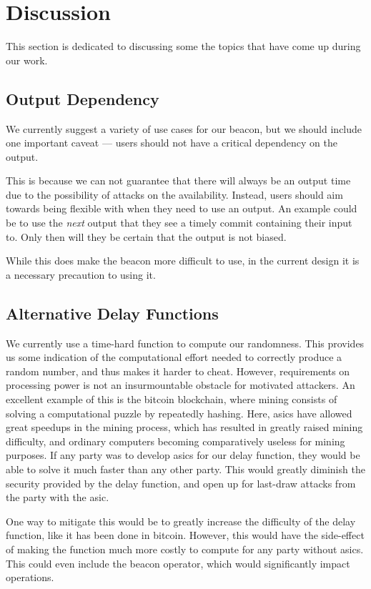 \section{Discussion}%
\label{sec:discussion}
This section is dedicated to discussing some the topics that have come up during our work.

\subsection{Output Dependency}
We currently suggest a variety of use cases for our beacon, but we should include one important caveat --- users should not have a critical dependency on the output.

This is because we can not guarantee that there will always be an output time due to the possibility of attacks on the availability.
Instead, users should aim towards being flexible with when they need to use an output. An example could be to use the \textit{next} output that they see a timely commit containing their input to. Only then will they be certain that the output is not biased.

While this does make the beacon more difficult to use, in the current design it is a necessary precaution to using it.

\subsection{Alternative Delay Functions}
We currently use a time-hard function to compute our randomness. This provides us some indication of the computational effort needed to correctly produce a random number, and thus makes it harder to cheat.
However, requirements on processing power is not an insurmountable obstacle for motivated attackers. An excellent example of this is the bitcoin blockchain, where mining consists of solving a computational puzzle by repeatedly hashing. Here, \glspl{asic} have allowed great speedups in the mining process, which has resulted in greatly raised mining difficulty, and ordinary computers becoming comparatively useless for mining purposes.
If any party was to develop \glspl{asic} for our delay function, they would be able to solve it much faster than any other party. This would greatly diminish the security provided by the delay function, and open up for last-draw attacks from the party with the \gls{asic}.

One way to mitigate this would be to greatly increase the difficulty of the delay function, like it has been done in bitcoin. However, this would have the side-effect of making the function much more costly to compute for any party without \glspl{asic}. This could even include the beacon operator, which would significantly impact operations.

